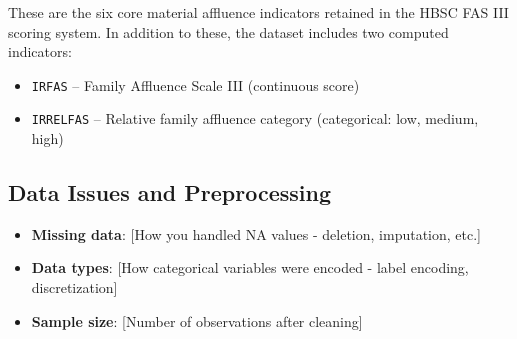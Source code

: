 These are the six core material affluence indicators retained in the HBSC FAS III scoring system. In addition to these, the dataset includes two computed indicators:
\begin{itemize}
  \item \texttt{IRFAS} – Family Affluence Scale III (continuous score)
  \item \texttt{IRRELFAS} – Relative family affluence category (categorical: low, medium, high)
\end{itemize}

\subsection{Data Issues and Preprocessing}
\begin{itemize}
    \item \textbf{Missing data}: [How you handled NA values - deletion, imputation, etc.]
    \item \textbf{Data types}: [How categorical variables were encoded - label encoding, discretization]
    \item \textbf{Sample size}: [Number of observations after cleaning]
\end{itemize}


